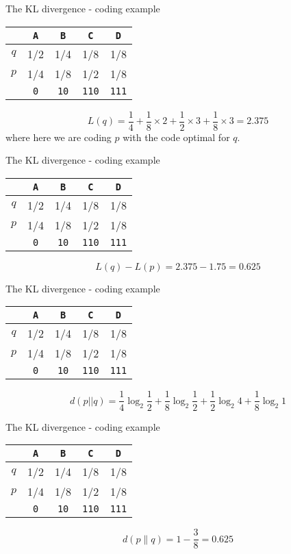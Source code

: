 \documentclass{beamer}
\newcommand{\crish}{\color{reddish}}
\newcommand{\cbla}{\color{black}}
\newcommand{\letter}[1]{\color{blue}\texttt{#1}\color{black}}
\newcommand{\binary}[1]{\color{red}\texttt{#1}\color{black}}
\begin{document}
\begin{frame}{The KL divergence - coding example}
\begin{center}
\begin{tabular}{c|cccc}
&\letter{A}&\letter{B}&\letter{C}&\letter{D}\\
\hline
$q$&1/2&1/4&1/8&1/8\\
$p$&1/4&1/8&1/2&1/8\\
\hline
&\binary{0}&\binary{10}&\binary{110}&\binary{111}
\end{tabular}
\end{center}
\crish
$$
L(q)=\frac{1}{4}+\frac{1}{8}\times 2 +\frac{1}{2}\times 3+\frac{1}{8}\times 3=2.375
$$
\cbla
where here we are coding $p$ with the code optimal for $q$.
\end{frame}


\begin{frame}{The KL divergence - coding example}
\begin{center}
\begin{tabular}{c|cccc}
&\letter{A}&\letter{B}&\letter{C}&\letter{D}\\
\hline
$q$&1/2&1/4&1/8&1/8\\
$p$&1/4&1/8&1/2&1/8\\
\hline
&\binary{0}&\binary{10}&\binary{110}&\binary{111}
\end{tabular}
\end{center}
\crish
$$
L(q)-L(p)=2.375-1.75=0.625
$$
\cbla
\end{frame}


\begin{frame}{The KL divergence - coding example}
\begin{center}
\begin{tabular}{c|cccc}
&\letter{A}&\letter{B}&\letter{C}&\letter{D}\\
\hline
$q$&1/2&1/4&1/8&1/8\\
$p$&1/4&1/8&1/2&1/8\\
\hline
&\binary{0}&\binary{10}&\binary{110}&\binary{111}
\end{tabular}
\end{center}
\crish
$$
d(p||q)=\frac{1}{4}\log_2{\frac{1}{2}}+\frac{1}{8}\log_2{\frac{1}{2}}+\frac{1}{2}\log_2{4}+\frac{1}{8}\log_2{1}
$$
\cbla
\end{frame}


\begin{frame}{The KL divergence - coding example}
\begin{center}
\begin{tabular}{c|cccc}
&\letter{A}&\letter{B}&\letter{C}&\letter{D}\\
\hline
$q$&1/2&1/4&1/8&1/8\\
$p$&1/4&1/8&1/2&1/8\\
\hline
&\binary{0}&\binary{10}&\binary{110}&\binary{111}
\end{tabular}
\end{center}
\crish
$$
d(p\|q)=1-\frac{3}{8}=0.625
$$
\cbla
\end{frame}
\end{document}
